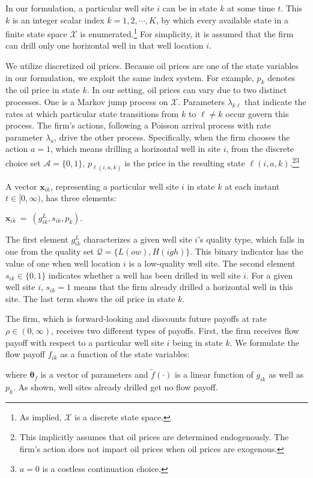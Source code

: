 In our formulation, a particular well site $i$ can be in state $k$ at some time $t$. This $k$ is an integer scalar index $k = 1, 2, \cdots, K$, by which every available state in a finite state space $\mathcal{X}$ is enumerated.\footnote{As implied, $\mathcal{X}$ is a discrete state space.} For simplicity, it is assumed that the firm can drill only one horizontal well in that well location $i$. 

We utilize discretized oil prices. Because oil prices are one of the state variables in our formulation, we exploit the same index system. For example, $p_{k}$ denotes the oil price in state $k$. In our setting, oil prices can vary due to two distinct processes. One is a Markov jump process on $\mathcal{X}$. Parameters $\lambda_{k\ell}$ that indicate the rates at which particular state transitions from $k$ to $\ell \neq k$ occur govern this process. The firm's actions, following a Poisson arrival process with rate parameter $\lambda_{a}$, drive the other process. Specifically, when the firm chooses the action $a = 1$, which means drilling a horizontal well in site $i$, from the discrete choice set $\mathcal{A} = \{ 0, 1 \}$, $p_{\ell(i, a, k)}$ is the price in the resulting state $\ell(i, a, k)$.\footnote{This implicitly assumes that oil prices are determined endogenously. The firm's action does not impact oil prices when oil prices are exogenous.}\footnote{$a = 0$ is a costless continuation choice.}

A vector $\boldsymbol{x}_{ik}$, representing a particular well site $i$ in state $k$ at each instant $t \in [0, \infty)$, has three elements:
\begin{center}
    $\boldsymbol{x}_{ik} \ = \ (g_{ik}^{L}, s_{ik}, p_{k}).$
\end{center}
The first element $g_{ik}^{L}$ characterizes a given well site $i$'s quality type, which falls in one from the quality set $\mathcal{Q} = \{ L(ow), H(igh) \}$. This binary indicator has the value of one when well location $i$ is a low-quality well site. The second element $s_{ik} \in \{ 0, 1 \}$ indicates whether a well has been drilled in well site $i$. For a given well site $i$, $s_{ik} = 1$ means that the firm already drilled a horizontal well in this site. The last term shows the oil price in state $k$.

The firm, which is forward-looking and discounts future payoffs at rate $\rho \in (0, \infty)$, receives two different types of payoffs. First, the firm receives flow payoff with respect to a particular well site $i$ being in state $k$. We formulate the flow payoff $f_{ik}$ as a function of the state variables:

where $\boldsymbol{\theta}_{f}$ is a vector of parameters and $\widetilde{f} (\cdot)$ is a linear function of $g_{ik}$ as well as $p_{k}$. As shown, well sites already drilled get no flow payoff. 

